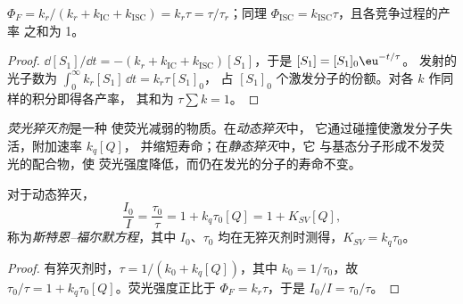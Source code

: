 \begin{proposition}[量子产率与寿命]\label{prop:b3:electronic-spectroscopy:quantum-yield}
$\Phi_F = k_r/(k_r + k_{\mathrm{IC}} + k_{\mathrm{ISC}}) = k_r\tau = \tau/\tau_r$；同理
$\Phi_{\mathrm{ISC}} = k_{\mathrm{ISC}}\tau$，且各竞争过程的产率
之和为 1。
\end{proposition}

\begin{proof}
$\dd[S_1]/\dd t = -(k_r + k_{\mathrm{IC}} + k_{\mathrm{ISC}})[S_1]$，于是 $[S_1] = [S_1]_0\eu^{-t/\tau}$。
发射的光子数为 $\int_0^\infty k_r[S_1]\,\dd t = k_r\tau[S_1]_0$，
占 $[S_1]_0$ 个激发分子的份额。对各 $k$ 作同样的积分即得各产率，
其和为 $\tau\sum k = 1$。
\end{proof}

\begin{definition}\label{def:b3:electronic-spectroscopy:quencher}
\emph{荧光猝灭剂}是一种
使荧光减弱的物质。在\emph{动态猝灭}中，
它通过碰撞使激发分子失活，附加速率 $k_q[Q]$，
并缩短寿命；在\emph{静态猝灭}中，它
与基态分子形成不发荧光的配合物，使
荧光强度降低，而仍在发光的分子的寿命不变。
\end{definition}

\begin{theorem}\label{thm:b3:electronic-spectroscopy:stern-volmer}
对于动态猝灭，
\[
\frac{I_0}{I} = \frac{\tau_0}{\tau} = 1 + k_q\tau_0[Q] = 1 + K_{SV}[Q],
\]
称为\emph{斯特恩–福尔默方程}，其中 $I_0$、$\tau_0$
均在无猝灭剂时测得，$K_{SV} = k_q\tau_0$。
\end{theorem}

\begin{proof}
有猝灭剂时，$\tau = 1/(k_0 + k_q[Q])$，其中 $k_0 = 1/\tau_0$，故 $\tau_0/\tau = 1 +
k_q\tau_0[Q]$。荧光强度正比于 $\Phi_F = k_r\tau$，于是 $I_0/I = \tau_0/\tau$。
\end{proof}

